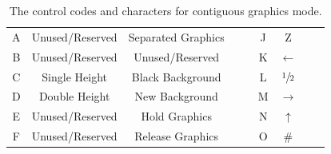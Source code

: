 \begin{table}
\begin{tabular}{|c|c|c|c|c|c|c|c|c|}
 A &Unused/Reserved&Separated Graphics		& \sixel{\bb}{\ff}{\bb}{\ff}{\bb}{\bb} & \sixel{\bb}{\ff}{\bb}{\ff}{\ff}{\bb} & J & Z           & \sixel{\bb}{\ff}{\bb}{\ff}{\bb}{\ff} & \sixel{\bb}{\ff}{\bb}{\ff}{\ff}{\ff}\\
 B &Unused/Reserved&Unused/Reserved		& \sixel{\ff}{\ff}{\bb}{\ff}{\bb}{\bb} & \sixel{\ff}{\ff}{\bb}{\ff}{\ff}{\bb} & K & $\leftarrow$& \sixel{\ff}{\ff}{\bb}{\ff}{\bb}{\ff} & \sixel{\ff}{\ff}{\bb}{\ff}{\ff}{\ff}\\
 C &Single Height  &Black Background		& \sixel{\bb}{\bb}{\ff}{\ff}{\bb}{\bb} & \sixel{\bb}{\bb}{\ff}{\ff}{\ff}{\bb} & L &$\sfrac{1}{2}$& \sixel{\bb}{\bb}{\ff}{\ff}{\bb}{\ff} & \sixel{\bb}{\bb}{\ff}{\ff}{\ff}{\ff}\\
 D &Double Height  &New Background		& \sixel{\ff}{\bb}{\ff}{\ff}{\bb}{\bb} & \sixel{\ff}{\bb}{\ff}{\ff}{\ff}{\bb} & M &$\rightarrow$ & \sixel{\ff}{\bb}{\ff}{\ff}{\bb}{\ff} & \sixel{\ff}{\bb}{\ff}{\ff}{\ff}{\ff}\\
 E &Unused/Reserved&Hold Graphics		& \sixel{\bb}{\ff}{\ff}{\ff}{\bb}{\bb} & \sixel{\bb}{\ff}{\ff}{\ff}{\ff}{\bb} & N & $\uparrow$  & \sixel{\bb}{\ff}{\ff}{\ff}{\bb}{\ff} & \sixel{\bb}{\ff}{\ff}{\ff}{\ff}{\ff}\\
 F &Unused/Reserved&Release Graphics		& \sixel{\ff}{\ff}{\ff}{\ff}{\bb}{\bb} & \sixel{\ff}{\ff}{\ff}{\ff}{\ff}{\bb} & O & \#           & \sixel{\ff}{\ff}{\ff}{\ff}{\bb}{\ff} & \sixel{\ff}{\ff}{\ff}{\ff}{\ff}{\ff}\\ \hline
\end{tabular}
\caption{The control codes and characters for contiguous graphics mode.}
\label{tab:contgraph}
\end{table}

